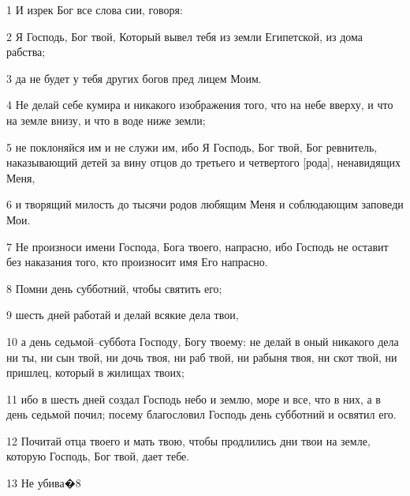\par 1 И изрек Бог все слова сии, говоря:
\par 2 Я Господь, Бог твой, Который вывел тебя из земли Египетской, из дома рабства;
\par 3 да не будет у тебя других богов пред лицем Моим.
\par 4 Не делай себе кумира и никакого изображения того, что на небе вверху, и что на земле внизу, и что в воде ниже земли;
\par 5 не поклоняйся им и не служи им, ибо Я Господь, Бог твой, Бог ревнитель, наказывающий детей за вину отцов до третьего и четвертого [рода], ненавидящих Меня,
\par 6 и творящий милость до тысячи родов любящим Меня и соблюдающим заповеди Мои.
\par 7 Не произноси имени Господа, Бога твоего, напрасно, ибо Господь не оставит без наказания того, кто произносит имя Его напрасно.
\par 8 Помни день субботний, чтобы святить его;
\par 9 шесть дней работай и делай всякие дела твои,
\par 10 а день седьмой--суббота Господу, Богу твоему: не делай в оный никакого дела ни ты, ни сын твой, ни дочь твоя, ни раб твой, ни рабыня твоя, ни скот твой, ни пришлец, который в жилищах твоих;
\par 11 ибо в шесть дней создал Господь небо и землю, море и все, что в них, а в день седьмой почил; посему благословил Господь день субботний и освятил его.
\par 12 Почитай отца твоего и мать твою, чтобы продлились дни твои на земле, которую Господь, Бог твой, дает тебе.
\par 13 Не убива�8

